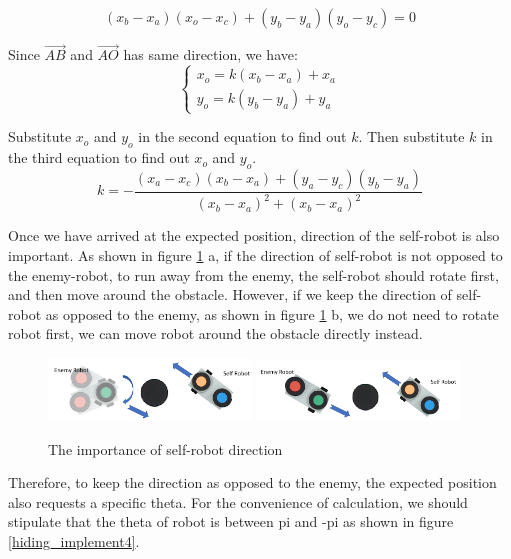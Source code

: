 \begin{equation}
(x_{b}-x_{a})(x_{o}-x_{c})+(y_{b}-y_{a})(y_{o}-y_{c})=0
\end{equation}

Since $\overrightarrow{AB}$ and $\overrightarrow{AO}$ has same direction, we have:
\begin{equation}
\left\{\begin{matrix}
x_{o}=k({x_{b}}-{x_{a}})+{x_{a}}\\
y_{o}=k({y_{b}}-{y_{a}})+{y_{a}}
\end{matrix}\right.
\end{equation}

Substitute $x_o$ and $y_o$ in the second equation to find out $k$. Then substitute $k$ in the third equation to find out $x_o$ and $y_o$.
\begin{equation}
    k=-\frac{(x_{a}-x_{c})(x_{b}-x_{a})+(y_{a}-y_{c})(y_{b}-y_{a})}{(x_{b}-x_{a})^{2}+(x_{b}-x_{a})^{2}}
\end{equation}

Once we have arrived at the expected position, direction of the self-robot is also important. As shown in figure \ref{hiding_implement3} a, if the direction of self-robot is not opposed to the enemy-robot, to run away from the enemy, the self-robot should rotate first, and then move around the obstacle. However, if we keep the direction of self-robot as opposed to the enemy, as shown in figure \ref{hiding_implement3} b, we do not need to rotate robot first, we can move robot around the obstacle directly instead.
\begin{figure}[htbp]
\centering
\includegraphics[width =0.48\textwidth]{images/implementofhiding3-1.png}
\includegraphics[width =0.48\textwidth]{images/implementofhiding3-2.png}
\caption{The importance of self-robot direction}\label{hiding_implement3}
\end{figure}

Therefore, to keep the direction as opposed to the enemy, the expected position also requests a specific theta.  For the convenience of calculation, we should stipulate that the theta of robot is between pi and -pi as shown in figure \ref{hiding_implement4}.

